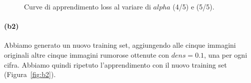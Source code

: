 \documentclass[a4paper,12pt]{article}
\begin{document}
\begin{figure}[htp]
    \centering

    \medskip


    \caption{Curve di apprendimento loss al variare di $alpha$ (4/5) e (5/5).}
    \label{fig:b1-3}
\end{figure}


\newpage
\paragraph{(b2)} Abbiamo generato un nuovo training set, aggiungendo alle cinque immagini originali altre cinque immagini rumorose ottenute con $dens=0.1$, una per ogni cifra. Abbiamo quindi ripetuto l'apprendimento con il nuovo training set (Figura~\vref{fig:b2}). 
\end{document}
